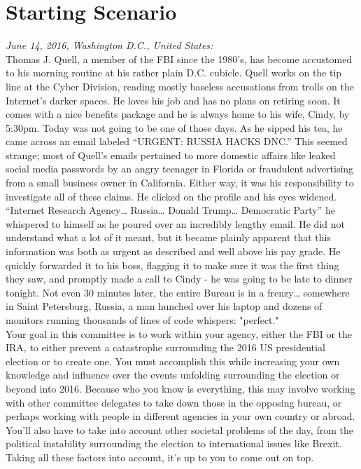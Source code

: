\documentclass[10pt, letterpaper]{article}
\begin{document}
\section{Starting Scenario}

\emph{June 14, 2016, Washington D.C., United States:} \\

Thomas J. Quell, a member of the FBI since the 1980's, has become
accustomed to his morning routine at his rather plain D.C. cubicle.
Quell works on the tip line at the Cyber Division, reading mostly
baseless accusations from trolls on the Internet's darker spaces. He
loves his job and has no plans on retiring soon. It comes with a nice
benefits package and he is always home to his wife, Cindy, by 5:30pm.
Today was not going to be one of those days. As he sipped his tea, he
came across an email labeled ``URGENT: RUSSIA HACKS DNC.'' This seemed
strange; most of Quell's emails pertained to more domestic affairs like
leaked social media passwords by an angry teenager in Florida or
fraudulent advertising from a small business owner in California. Either
way, it was his responsibility to investigate all of these claims. He
clicked on the profile and his eyes widened. ``Internet Research
Agency\ldots{} Russia\ldots{} Donald Trump\ldots{} Democratic Party'' he
whispered to himself as he poured over an incredibly lengthy email. He
did not understand what a lot of it meant, but it became plainly
apparent that this information was both as urgent as described and well
above his pay grade. He quickly forwarded it to his boss, flagging it to
make sure it was the first thing they saw, and promptly made a call to
Cindy - he was going to be late to dinner tonight. Not even 30 minutes
later, the entire Bureau is in a frenzy\ldots{} somewhere in Saint
Petersburg, Russia, a man hunched over his laptop and dozens of monitors
running thousands of lines of code whispers: "perfect." \\

Your goal in this committee is to work within your agency, either the
FBI or the IRA, to either prevent a catastrophe surrounding the 2016 US
presidential election or to create one. You must accomplish this while
increasing your own knowledge and influence over the events unfolding
surrounding the election or beyond into 2016. Because who you know is
everything, this may involve working with other committee delegates to
take down those in the opposing bureau, or perhaps working with people
in different agencies in your own country or abroad. You'll also have to
take into account other societal problems of the day, from the political
instability surrounding the election to international issues like
Brexit. Taking all these factors into account, it's up to you to come
out on top. \\
\end{document}
